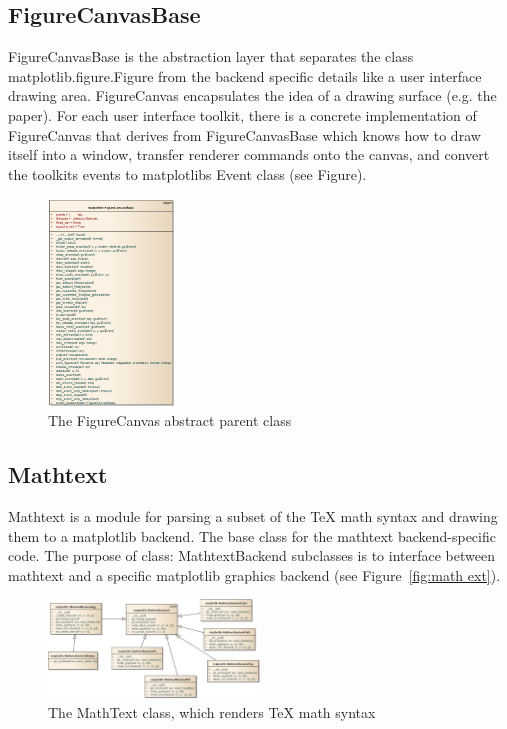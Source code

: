 \documentclass[pdftex,10pt,a4paper]{report}
\begin{document}
\subsection{FigureCanvasBase}

FigureCanvasBase is the abstraction layer that separates the class matplotlib.figure.Figure from the backend specific details like a user interface drawing area. FigureCanvas encapsulates the idea of a drawing surface (e.g. the paper). For each user interface toolkit, there is a concrete implementation of FigureCanvas that derives from FigureCanvasBase which knows how to draw itself into a window, transfer renderer commands onto the canvas, and convert the toolkits events to matplotlibs Event class (see Figure).

\begin{figure}[ht!]
        \centering
                \includegraphics[width=0.3\textwidth]{img/umls/nick/figcanbase}
        \caption{The FigureCanvas abstract parent class}\label{fig:artistExAgg}
\end{figure}


\subsection{Mathtext}

Mathtext is a module for parsing a subset of the TeX math syntax and drawing them to a matplotlib backend. The base class for the mathtext backend-specific code.  The purpose of class: MathtextBackend subclasses is to interface between mathtext and a specific matplotlib graphics backend (see Figure~\ref{fig:math ext}).

\begin{figure}[ht!]
        \centering
                \includegraphics[width=0.5\textwidth]{img/umls/kevin/mathtext}
        \caption{The MathText class, which renders TeX math syntax}\label{fig:math text}
\end{figure}
\end{document}
